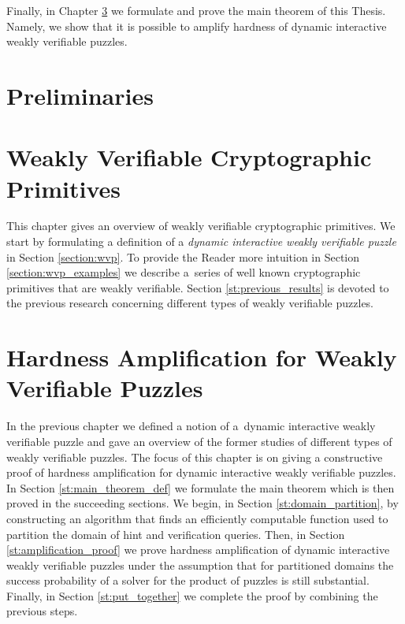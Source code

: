\documentclass[11pt,a4paper,titlepage]{memoir}
\begin{document}
Finally, in Chapter \ref{ch:main_result} we formulate and prove the main theorem of this Thesis.
Namely, we show that it is possible to amplify hardness of dynamic interactive weakly verifiable puzzles.
%
\chapter{Preliminaries}
\label{ch:preliminaries}


\chapter{Weakly Verifiable Cryptographic Primitives}
\label{ch:intro_weakly}
This chapter gives an overview of weakly verifiable cryptographic primitives.
We start by formulating a definition of a \textit{dynamic interactive weakly verifiable puzzle} in Section \ref{section:wvp}.
To provide the Reader more intuition in Section \ref{section:wvp_examples} we describe a~series of well known cryptographic primitives
that are weakly verifiable. Section \ref{st:previous_results} is devoted to the previous research concerning different types of weakly verifiable puzzles.
%



%
%
\chapter{Hardness Amplification for Weakly Verifiable Puzzles}
\label{ch:main_result}
In the previous chapter we defined a notion of a~dynamic interactive weakly verifiable puzzle
and gave an overview of the former studies of different types of weakly verifiable puzzles.
The focus of this chapter is on giving a constructive proof of hardness amplification for dynamic interactive weakly verifiable puzzles.
In Section \ref{st:main_theorem_def} we formulate the main theorem which is then proved in the succeeding sections.
We begin, in Section \ref{st:domain_partition}, by constructing an algorithm that finds an efficiently computable function used
to partition the domain of hint and verification queries. Then, in Section \ref{st:amplification_proof} we prove
hardness amplification of dynamic interactive weakly verifiable puzzles under the assumption that for partitioned domains
the success probability of a solver for the product of puzzles is still substantial.
Finally, in Section \ref{st:put_together} we complete the proof by combining the previous steps.
%

%

%

%

%
\end{document}
